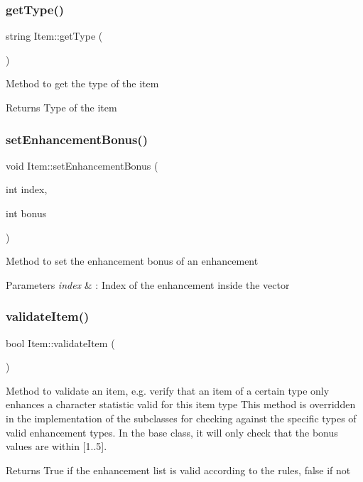 \subsubsection{\texorpdfstring{get\+Type()}{getType()}}
{\footnotesize\ttfamily string Item\+::get\+Type (\begin{DoxyParamCaption}{ }\end{DoxyParamCaption})}

Method to get the type of the item \begin{DoxyReturn}{Returns}
Type of the item 
\end{DoxyReturn}
\hypertarget{class_item_a31da3e0fed93e6bcf2402e2c65259c2e}{}\label{class_item_a31da3e0fed93e6bcf2402e2c65259c2e} 
\subsubsection{\texorpdfstring{set\+Enhancement\+Bonus()}{setEnhancementBonus()}}
{\footnotesize\ttfamily void Item\+::set\+Enhancement\+Bonus (\begin{DoxyParamCaption}\item[{int}]{index,  }\item[{int}]{bonus }\end{DoxyParamCaption})}

Method to set the enhancement bonus of an enhancement 
\begin{DoxyParams}{Parameters}
{\em index} & \+: Index of the enhancement inside the vector \\
\hline
\end{DoxyParams}
\hypertarget{class_item_a6603371b60aaded48f697975c81fc25b}{}\label{class_item_a6603371b60aaded48f697975c81fc25b} 
\subsubsection{\texorpdfstring{validate\+Item()}{validateItem()}}
{\footnotesize\ttfamily bool Item\+::validate\+Item (\begin{DoxyParamCaption}{ }\end{DoxyParamCaption})\hspace{0.3cm}{\ttfamily [virtual]}}

Method to validate an item, e.\+g. verify that an item of a certain type only enhances a character statistic valid for this item type This method is overridden in the implementation of the subclasses for checking against the specific types of valid enhancement types. In the base class, it will only check that the bonus values are within \mbox{[}1..5\mbox{]}. \begin{DoxyReturn}{Returns}
True if the enhancement list is valid according to the rules, false if not 
\end{DoxyReturn}


